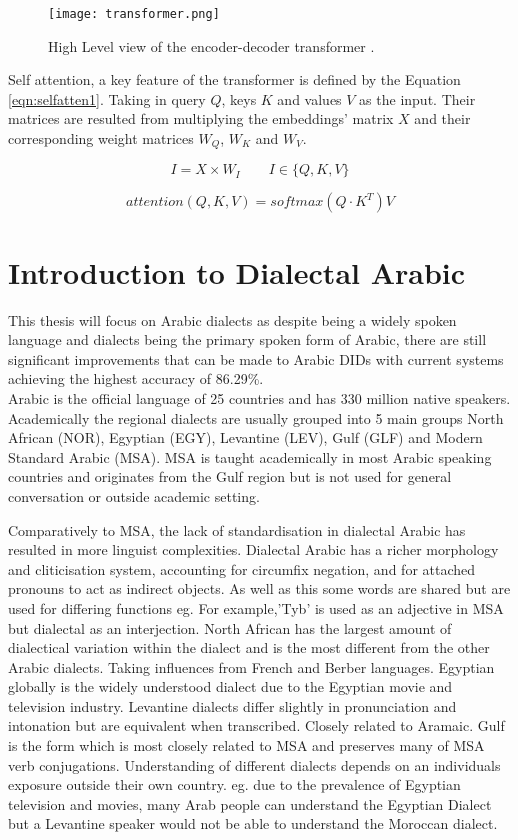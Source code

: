 \begin{figure}[h!]
    \centering
    \texttt{[image: transformer.png]}
    \caption{High Level view of the encoder-decoder transformer \cite{jay_alammar_illustrated_nodate}.}
    \label{fig:transformer}
\end{figure}


Self attention, a key feature of the transformer is defined by the Equation \ref{eqn:selfatten1}. Taking in query $Q$, keys $K$ and values $V$ as the input. 
Their matrices are resulted from multiplying the embeddings' matrix $X$ and their corresponding weight matrices $W_Q$, $W_K$ and $W_V$. 

\[ I = X\times W_I \qquad I \in \{Q,K,V\}\]\label{eqn:selfatten1}

\[attention(Q,K,V) = softmax(Q \cdot K^T)V\]\label{eqn:selfatten2}
\pagebreak
\section{Introduction to Dialectal Arabic}\label{sect:introdialect}
This thesis will focus on Arabic dialects as despite being a widely spoken language and dialects 
being the primary spoken form of Arabic, there are still significant 
improvements that can be made to Arabic DIDs with current systems achieving the highest accuracy of 86.29\%. \\

Arabic is the official language of 25 countries and has 330 million native speakers.
\\Academically the regional dialects are usually grouped into 5 main groups North African (NOR), Egyptian (EGY), Levantine (LEV), Gulf (GLF) and Modern Standard Arabic (MSA). 
MSA is taught academically in most Arabic speaking countries and originates from the Gulf region but is not used 
for general conversation or outside academic setting.

Comparatively to MSA, the lack of standardisation in dialectal Arabic has resulted in more linguist complexities.
Dialectal Arabic has a richer morphology and cliticisation system, accounting for circumfix negation, 
and for attached pronouns to act as indirect objects. As well as this some words are shared but are used for
differing functions eg. For example,'Tyb' is used as an adjective in MSA but dialectal as an interjection. 
North African has the largest amount of dialectical variation within the dialect and is the most different from the other Arabic dialects. Taking influences from French and Berber languages. 
Egyptian globally is the widely understood dialect due to the Egyptian movie and television industry. 
Levantine dialects differ slightly in pronunciation and intonation but are equivalent when transcribed. Closely related to Aramaic. 
Gulf is the form which is most closely related to MSA and preserves many of MSA verb conjugations. 
Understanding of different dialects depends on an individuals exposure outside their own country. eg. due to the prevalence of Egyptian television and movies,
many Arab people can understand the Egyptian Dialect but a Levantine speaker would not be able to understand 
the Moroccan dialect. 


